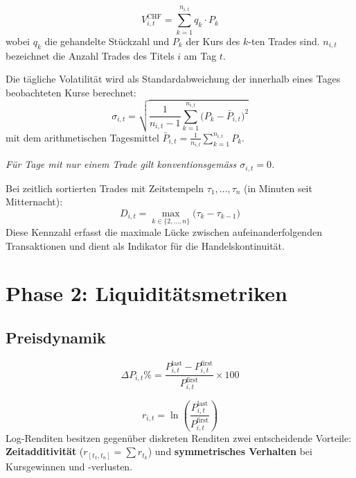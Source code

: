 \documentclass[12pt, a4paper, oneside]{report}
\begin{document}
\begin{mathbox}
\[
  V_{i,t}^{\text{CHF}} = \sum_{k=1}^{n_{i,t}} q_k \cdot P_k
\]
wobei $q_k$ die gehandelte Stückzahl und $P_k$ der Kurs des $k$-ten Trades sind. $n_{i,t}$ bezeichnet die Anzahl Trades des Titels $i$ am Tag $t$.
\end{mathbox}

\begin{mathbox}
Die tägliche Volatilität wird als Standardabweichung der innerhalb eines Tages beobachteten Kurse berechnet:
\[
  \sigma_{i,t} = \sqrt{\frac{1}{n_{i,t}-1}\sum_{k=1}^{n_{i,t}}\bigl(P_k - \bar{P}_{i,t}\bigr)^2}
\]
mit dem arithmetischen Tagesmittel $\bar{P}_{i,t} = \frac{1}{n_{i,t}}\sum_{k=1}^{n_{i,t}} P_k$.

\textit{Für Tage mit nur einem Trade gilt konventionsgemäss $\sigma_{i,t} = 0$.}
\end{mathbox}

\begin{mathbox}
Bei zeitlich sortierten Trades mit Zeitstempeln $\tau_1, \ldots, \tau_{n}$ (in Minuten seit Mitternacht):
\[
  D_{i,t} = \max_{k \in \{2,\ldots,n\}} \bigl(\tau_k - \tau_{k-1}\bigr)
\]
Diese Kennzahl erfasst die maximale Lücke zwischen aufeinanderfolgenden Transaktionen und dient als Indikator für die Handelskontinuität.
\end{mathbox}

\section{Phase 2: Liquiditätsmetriken}

\subsection{Preisdynamik}

\begin{mathbox}
\[
  \Delta P_{i,t}\% = \frac{P_{i,t}^{\text{last}} - P_{i,t}^{\text{first}}}{P_{i,t}^{\text{first}}} \times 100
\]
\end{mathbox}

\begin{mathbox}
\[
  r_{i,t} = \ln\!\left(\frac{P_{i,t}^{\text{last}}}{P_{i,t}^{\text{first}}}\right)
\]
Log-Renditen besitzen gegenüber diskreten Renditen zwei entscheidende Vorteile: \textbf{Zeitadditivität} ($r_{[t_1, t_n]} = \sum r_{t_k}$) und \textbf{symmetrisches Verhalten} bei Kursgewinnen und -verlusten.
\end{mathbox}
\end{document}
